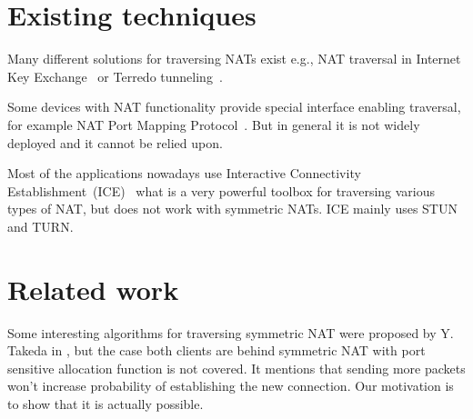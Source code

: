 \documentclass[twoside]{article}
\begin{document}
\begin{multicols}{2}
% 
% 
% 


\section{Existing techniques}
Many different solutions for traversing NATs exist e.g., NAT traversal in Internet Key Exchange~\citep{rfc3947} or Terredo tunneling~\citep{rfc4380}.

Some devices with NAT functionality provide special interface enabling traversal, for example NAT Port Mapping Protocol~\citep{rfc6886}. But in general 
it is not widely deployed and it cannot be relied upon. 

Most of the applications nowadays use Interactive Connectivity Establishment~(ICE)~\citep{rfc5245} what is a very powerful toolbox for traversing 
various types of NAT, but does not work with symmetric NATs. ICE mainly uses STUN and TURN.

\section{Related work}
Some interesting algorithms for traversing symmetric NAT were proposed by Y. Takeda in \citep{takeda}, but the case both clients are behind symmetric NAT
with port sensitive allocation function is not covered. It mentions that sending more packets won't increase probability of establishing the new connection.
Our motivation is to show that it is actually possible.


\end{multicols}
\end{document}
